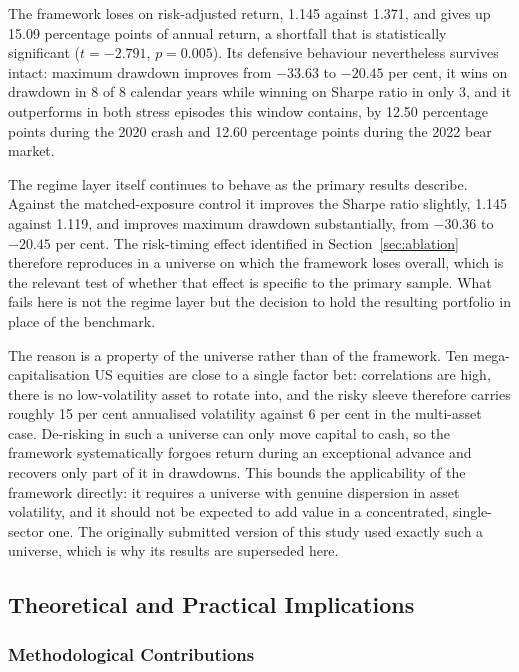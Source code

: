 The framework loses on risk-adjusted return, 1.145 against 1.371, and gives up 15.09
percentage points of annual return, a shortfall that is statistically significant
($t = -2.791$, $p = 0.005$). Its defensive behaviour nevertheless survives intact:
maximum drawdown improves from $-33.63$ to $-20.45$ per cent, it wins on drawdown in 8 of
8 calendar years while winning on Sharpe ratio in only 3, and it outperforms in both
stress episodes this window contains, by 12.50 percentage points during the 2020 crash
and 12.60 percentage points during the 2022 bear market.

The regime layer itself continues to behave as the primary results describe. Against the
matched-exposure control it improves the Sharpe ratio slightly, 1.145 against 1.119, and
improves maximum drawdown substantially, from $-30.36$ to $-20.45$ per cent. The
risk-timing effect identified in Section~\ref{sec:ablation} therefore reproduces in a
universe on which the framework loses overall, which is the relevant test of whether that
effect is specific to the primary sample. What fails here is not the regime layer but the
decision to hold the resulting portfolio in place of the benchmark.

The reason is a property of the universe rather than of the framework. Ten
mega-capitalisation US equities are close to a single factor bet: correlations are high,
there is no low-volatility asset to rotate into, and the risky sleeve therefore carries
roughly 15 per cent annualised volatility against 6 per cent in the multi-asset case.
De-risking in such a universe can only move capital to cash, so the framework
systematically forgoes return during an exceptional advance and recovers only part of it
in drawdowns. This bounds the applicability of the framework directly: it requires a
universe with genuine dispersion in asset volatility, and it should not be expected to
add value in a concentrated, single-sector one. The originally submitted version of this
study used exactly such a universe, which is why its results are superseded here.

\subsection{Theoretical and Practical Implications}

\subsubsection{Methodological Contributions}

